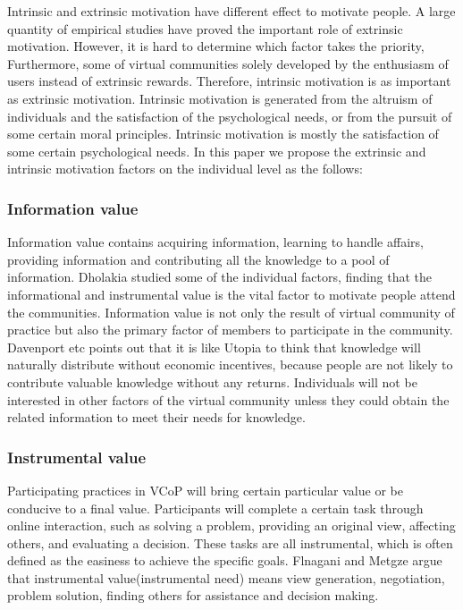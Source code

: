 \documentclass{elsarticle}
\begin{document}
Intrinsic and extrinsic motivation have different effect to motivate people\cite{deci1985ima}. A large quantity of empirical studies have proved the important role
of extrinsic motivation. However, it is hard to determine which factor
takes the priority, Furthermore, some of virtual communities solely 
developed by the enthusiasm of users instead of extrinsic
rewards. Therefore, intrinsic motivation is as important as extrinsic
motivation. Intrinsic motivation is generated from the altruism of
individuals and the satisfaction of the psychological needs, or from
the pursuit of some certain moral principles. Intrinsic motivation is
mostly the satisfaction of some certain psychological
needs\cite{josh_lerner_simple_2002}. In this paper we propose 
the extrinsic and intrinsic 
motivation factors on the individual level  as the
follows: 


\subsubsection{ Information value}

Information value contains acquiring
  information, learning to handle affairs, providing information and
  contributing all the knowledge to a pool of
  information\cite{flanagin2001internet}. Dholakia studied some of the individual factors, finding that the
informational and instrumental value is the vital
factor to motivate people attend the communities\cite{Dholakia2004241}. Information value is not only the result of
  virtual community of practice but also the primary factor of members
  to participate in the community. Davenport etc points out that it is like Utopia to think that
knowledge will naturally distribute without economic incentives,
because people are not likely to contribute valuable knowledge without
any returns\cite{davenport1998wko}. Individuals will not be interested
  in other factors of the virtual community unless they could obtain
  the related information to meet their needs for knowledge.

  \subsubsection{Instrumental value}
\label{sec:instrumental-value}
  
Participating practices in VCoP will bring certain particular value or
be conducive to a final value\cite{Roennow-Rasmussen2002}. 
Participants will complete a certain task through
online interaction, such as solving a problem, providing an original
view, affecting others, and evaluating a decision. These tasks are all
instrumental, which is often defined as the easiness to achieve the
specific goals. Flnagani and Metgze argue that instrumental
value(instrumental need) means view generation, negotiation, problem
solution, finding others for assistance and decision making\cite{flanagin2001internet}.
\end{document}
